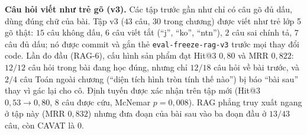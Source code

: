 \begin{table}[tp]
\centering
\caption{Ablation trên hai tập giữ riêng. Hit@$k$: tỉ lệ câu có đoạn liên quan trong $k$ đoạn đầu; KTC: khoảng bootstrap $95\%$. Đậm: MRR cao nhất trên tập v2. ``Phẳng'': không đưa tiết đang học vào truy xuất (Mục~\ref{sec:flat}); trên chương mẫu, câu hỏi không mang tiết nên phẳng và có đồ thị trùng nhau.}
\label{tab:ablation-main}

\end{table}

\begin{table}[tp]
\centering
\caption{Ablation từng thành phần (RAG-5, RAG-6): bỏ một thành phần khỏi cấu hình sản phẩm, so cặp theo câu. $\Delta$MRR âm: thành phần có ích; KTC: bootstrap cặp $95\%$; $p$: McNemar chính xác trên Hit@3. Bỏ vector là cấu hình từ khóa $+$ xếp hạng lại (định tuyến theo độ phủ từ khóa); bỏ phạm vi đồ thị là RAG phẳng. v3: câu viết như trẻ gõ, đóng băng trước RAG-6 nhưng đã dùng để sửa ở RAG-7; v4: đóng băng trước RAG-7.}
\label{tab:components}

\end{table}

\textbf{Câu hỏi viết như trẻ gõ (v3).} Các tập trước gần như chỉ có câu gõ đủ dấu, dùng đúng chữ của bài. Tập v3 ($43$ câu, $30$ trong chương) được viết như trẻ lớp 5 gõ thật: $15$ câu không dấu, $6$ câu viết tắt (``j'', ``ko'', ``ntn''), $2$ câu sai chính tả, $7$ câu đủ dấu; nó được commit và gắn thẻ \texttt{eval-freeze-rag-v3} trước mọi thay đổi code. Lần đo đầu (RAG-6), cấu hình sản phẩm đạt Hit@3 $0{,}80$ và MRR $0{,}822$: $12/12$ câu hỏi trong bài đang học đúng, nhưng chỉ $12/18$ câu hỏi về bài trước, và $2/4$ câu Toán ngoài chương (``diện tích hình tròn tính thế nào'') bị báo ``bài sau'' thay vì gác lại cho cô. Định tuyến được xác nhận trên tập mới (Hit@3 $0{,}53\to0{,}80$, $8$ câu được cứu, McNemar $p=0{,}008$). RAG phẳng truy xuất ngang ở tập này (MRR $0{,}832$) nhưng đưa đoạn của bài sau vào ba đoạn đầu ở $13/43$ câu, còn CAVAT là $0$.

